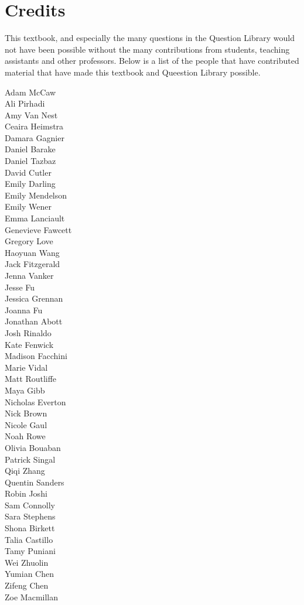 \section*{Credits}
This textbook, and especially the many questions in the Question Library would not have been possible without the many contributions from students, teaching assistants and other professors. Below is a list of the people that have contributed material that have made this textbook and Queestion Library possible. 

\begin{multicols}{3}
\begin{center}
Adam McCaw\\
Ali Pirhadi\\
Amy Van Nest\\
Ceaira Heimstra\\
Damara Gagnier\\
Daniel Barake \\
Daniel Tazbaz\\
David Cutler\\
Emily Darling\\
Emily Mendelson\\
Emily Wener\\
Emma Lanciault\\
Genevieve Fawcett\\
Gregory Love\\
Haoyuan Wang\\
Jack Fitzgerald\\
Jenna Vanker\\
\columnbreak
Jesse Fu\\
Jessica Grennan\\
Joanna Fu\\
Jonathan Abott\\
Josh Rinaldo\\
Kate Fenwick\\
Madison Facchini\\
Marie Vidal\\
Matt Routliffe\\
Maya Gibb\\
Nicholas Everton\\
Nick Brown\\
Nicole Gaul\\
Noah Rowe\\
Olivia Bouaban\\
Patrick Singal\\
Qiqi Zhang\\
Quentin Sanders\\
\columnbreak
Robin Joshi\\
Sam Connolly\\
Sara Stephens\\
Shona Birkett\\
Talia Castillo\\
Tamy Puniani\\
Wei Zhuolin\\
Yumian Chen\\
Zifeng Chen\\
Zoe Macmillan
\end{center}
\end{multicols}

